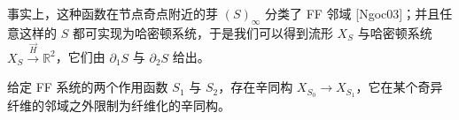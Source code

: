 事实上，这种函数在节点奇点附近的芽 $(S)_{\infty}$ 分类了 FF 邻域 [Ngoc03]；并且任意这样的 $S$ 都可实现为哈密顿系统，于是我们可以得到流形 $X_S$ 与哈密顿系统 $X_S\xrightarrow{\vec{H}}\mathbb{R}^2$，它们由 $\partial_1 S$ 与 $\partial_2 S$ 给出。

\begin{theorem*}[Sym03]
给定 FF 系统的两个作用函数 $S_1$ 与 $S_2$，存在辛同构 $X_{S_0}\to X_{S_1}$，它在某个奇异纤维的邻域之外限制为纤维化的辛同构。
\end{theorem*}


